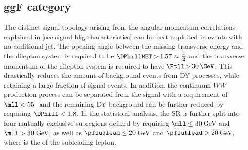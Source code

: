 \subsection{ggF \ZeroJet category}
\label{subsec:ggf-zero-jet-category}
The distinct signal topology arising from the angular momentum correlations explained in \cref{sec:signal-bkg-characteristics} can be best exploited in events with no additional jet.
The opening angle between the missing transverse energy and the dilepton system is required to be $\DPhillMET \,{>}\, 1.57 \approx \frac{\pi}{2}$ and the transverse momentum of the dilepton system is required to have $\Ptll \,{>}\, 30\,\GeV$.
This drastically reduces the amount of background events from DY processes, while retaining a large fraction of signal events.
In addition, the continuum $WW$ production process can be separated from the signal with a requirement of $\mll < 55$\,\GeV\ and the remaining DY background can be further reduced by requiring $\DPhill < 1.8$.
In the statistical analysis, the \ZeroJet SR is further split into four mutually exclusive subregions defined by requiring $\mll \le 30$\,GeV and $\mll > 30$\,GeV, as well as $\pTsublead \le 20$\,GeV and $\pTsublead > 20$\,GeV, where \pTsublead is the \pT of the subleading lepton.

